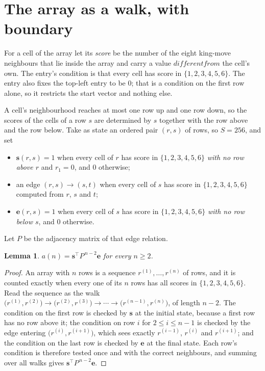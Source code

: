 \documentclass[11pt,a4paper]{article}
\theoremstyle{plain}
\newtheorem{lemma}[theorem]{Lemma}
\theoremstyle{definition}
\begin{document}
\section{The array as a walk, with boundary}

For a cell of the array let its \emph{score} be the number of the eight king-move neighbours that lie inside
the array and carry a value $different from$ the cell's own. The entry's condition is that every cell
has score in $\{1,2,3,4,5,6\}$. The entry also fixes the top-left entry to be $0$; that is a condition on the first row alone, so it restricts the start vector and nothing else.

A cell's neighbourhood reaches at most one row up and one row down, so the scores of the
cells of a row $s$ are determined by $s$ together with the row above and the row below.
Take as state an ordered pair $(r,s)$ of rows, so $S=256$, and set
\begin{itemize}
\item $\mathbf{s}(r,s)=1$ when every cell of $r$ has score in $\{1,2,3,4,5,6\}$ \emph{with no row
above $r$} and $r_1=0$, and $0$ otherwise;
\item an edge $(r,s)\to(s,t)$ when every cell of $s$ has score in $\{1,2,3,4,5,6\}$ computed from
$r$, $s$ and $t$;
\item $\mathbf{e}(r,s)=1$ when every cell of $s$ has score in $\{1,2,3,4,5,6\}$ \emph{with no row
below $s$}, and $0$ otherwise.
\end{itemize}
Let $P$ be the adjacency matrix of that edge relation.

\begin{lemma}\label{lem:walk}
$a(n)=\mathbf{s}^{\!\top}P^{\,n-2}\mathbf{e}$ for every $n\ge2$.
\end{lemma}

\begin{proof}
An array with $n$ rows is a sequence $r^{(1)},\dots,r^{(n)}$ of rows, and it is counted
exactly when every one of its $n$ rows has all scores in $\{1,2,3,4,5,6\}$. Read the sequence as the
walk $\bigl(r^{(1)},r^{(2)}\bigr)\to\bigl(r^{(2)},r^{(3)}\bigr)\to\cdots\to
\bigl(r^{(n-1)},r^{(n)}\bigr)$, of length $n-2$. The condition on the first row is
checked by $\mathbf{s}$ at the initial state, because a first row has no row above it; the
condition on row $i$ for $2\le i\le n-1$ is checked by the edge entering
$\bigl(r^{(i)},r^{(i+1)}\bigr)$, which sees exactly $r^{(i-1)}$, $r^{(i)}$ and
$r^{(i+1)}$; and the condition on the last row is checked by $\mathbf{e}$ at the final
state. Each row's condition is therefore tested once and with the correct neighbours, and
summing over all walks gives $\mathbf{s}^{\!\top}P^{\,n-2}\mathbf{e}$.
\end{proof}
\end{document}
